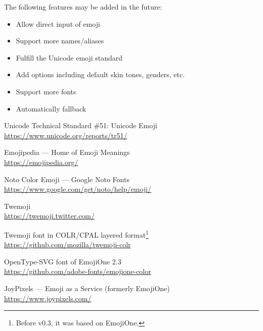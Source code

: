 \documentclass{l3doc}
\begin{document}
The following features may be added in the future:

\begin{itemize}
  \item Allow direct input of emoji
  \item Support more names/aliases
  \item Fulfill the Unicode emoji standard
  \item Add options including default skin tones, genders, etc.
  \item Support more fonts
  \item Automatically fallback
\end{itemize}

\begin{thebibliography}{9}
  \def\newblock{\\}
  \small

  Unicode\textregistered{} Technical Standard \#51: Unicode Emoji
  \newblock \url{https://www.unicode.org/reports/tr51/}

   Emojipedia ---  Home of Emoji Meanings
  \newblock \url{https://emojipedia.org/}

  Noto Color Emoji --- Google Noto Fonts
  \newblock \url{https://www.google.com/get/noto/help/emoji/}

  Twemoji
  \newblock \url{https://twemoji.twitter.com/}

  Twemoji font in COLR/CPAL layered format\footnote{Before v0.3, it was based on EmojiOne.}
  \newblock \url{https://github.com/mozilla/twemoji-colr}

  OpenType-SVG font of EmojiOne 2.3
  \newblock \url{https://github.com/adobe-fonts/emojione-color}

  JoyPixels\texttrademark{} --- Emoji as a Service (formerly EmojiOne)
  \newblock \url{https://www.joypixels.com/}
\end{thebibliography}
\end{document}
